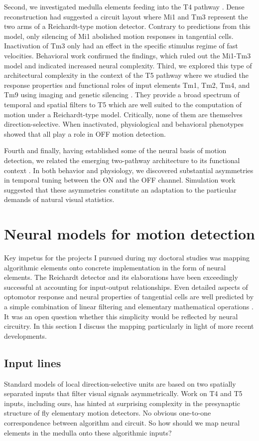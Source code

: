 Second, we investigated medulla elements feeding into the T4 pathway \citep{Ammer:2015jo}. Dense reconstruction had suggested a circuit layout where Mi1 and Tm3 represent the two arms of a Reichardt-type motion detector. Contrary to predictions from this model, only silencing of Mi1 abolished motion responses in tangential cells. Inactivation of Tm3 only had an effect in the specific stimulus regime of fast velocities. Behavioral work confirmed the findings, which ruled out the Mi1-Tm3 model and indicated increased neural complexity. Third, we explored this type of architectural complexity in the context of the T5 pathway where we studied the response properties and functional roles of input elements Tm1, Tm2, Tm4, and Tm9 using imaging and genetic silencing \citep{Serbe:2016ew}. They provide a broad spectrum of temporal and spatial filters to T5 which are well suited to the computation of motion under a Reichardt-type model. Critically, none of them are themselves direction-selective. When inactivated, physiological and behavioral phenotypes showed that all play a role in OFF motion detection. 

Fourth and finally, having established some of the neural basis of motion detection, we related the emerging two-pathway architecture to its functional context \citep{Leonhardt:2016ex}. In both behavior and physiology, we discovered substantial asymmetries in temporal tuning between the ON and the OFF channel. Simulation work suggested that these asymmetries constitute an adaptation to the particular demands of natural visual statistics.

\section{Neural models for motion detection}
Key impetus for the projects I pursued during my doctoral studies was mapping algorithmic elements onto concrete implementation in the form of neural elements. The Reichardt detector and its elaborations have been exceedingly successful at accounting for input-output relationships. Even detailed aspects of optomotor response and neural properties of tangential cells are well predicted by a simple combination of linear filtering and elementary mathematical operations \citep{Borst:1989vp,Borst:2002iw}. It was an open question whether this simplicity would be reflected by neural circuitry. In this section I discuss the mapping particularly in light of more recent developments.

\subsection{Input lines}
Standard models of local direction-selective units are based on two spatially separated inputs that filter visual signals asymmetrically. Work on T4 and T5 inputs, including ours, has hinted at surprising complexity in the presynaptic structure of fly elementary motion detectors. No obvious one-to-one correspondence between algorithm and circuit. So how should we map neural elements in the medulla onto these algorithmic inputs?


